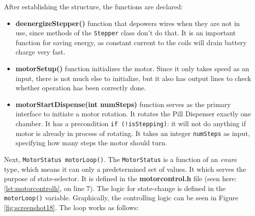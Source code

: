 After establishing the structure, the functions are declared:
\begin{itemize}
	\item \textbf{deenergizeStepper()} function that depowers wires when they are not in use, since methods of the \texttt{Stepper} class don't do that. It is an important function for saving energy, as constant current to the coils will drain battery charge very fast.
	\item \textbf{motorSetup()} function initializes the motor. Since it only takes speed as an input, there is not much else to initialize, but it also has output lines to check whether operation has been correctly done.
	\item \textbf{motorStartDispense(int numSteps)}  function serves as the primary interface to initiate a motor rotation. It rotates the Pill Dispenser exactly one chamber. It has a precondition \texttt{if (!isStepping)}: it will not do anything if motor is already in process of rotating. It takes an integer \texttt{numSteps} as input, specifying how many steps the motor should turn. 
\end{itemize}
Next, \texttt{MotorStatus motorLoop()}. The \texttt{MotorStatus} is a function of an \textit{enum} type, which means it can only a predetermined set of values. It which serves the purpose of state-selector. It is defined in the \textbf{motorcontrol.h} file (seen here: \ref{lst:motorcontrolh}, on line 7). The logic for state-change is defined in the \texttt{motorLoop()} variable. Graphically, the controlling logic can be seen in Figure \ref{fig:screenshot18}. The loop works as follows:

